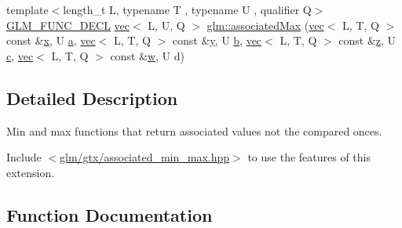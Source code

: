 \begin{DoxyCompactItemize}
\item 
{\footnotesize template$<$length\+\_\+t L, typename T , typename U , qualifier Q$>$ }\\\mbox{\hyperlink{setup_8hpp_ab2d052de21a70539923e9bcbf6e83a51}{G\+L\+M\+\_\+\+F\+U\+N\+C\+\_\+\+D\+E\+CL}} \mbox{\hyperlink{structglm_1_1vec}{vec}}$<$ L, U, Q $>$ \mbox{\hyperlink{group__gtx__associated__min__max_gab9c3dd74cac899d2c625b5767ea3b3fb}{glm\+::associated\+Max}} (\mbox{\hyperlink{structglm_1_1vec}{vec}}$<$ L, T, Q $>$ const \&\mbox{\hyperlink{_s_d_l__opengl_8h_ad0e63d0edcdbd3d79554076bf309fd47}{x}}, U \mbox{\hyperlink{_s_d_l__opengl__glext_8h_a3309789fc188587d666cda5ece79cf82}{a}}, \mbox{\hyperlink{structglm_1_1vec}{vec}}$<$ L, T, Q $>$ const \&\mbox{\hyperlink{_s_d_l__opengl_8h_a1675d9d7bb68e1657ff028643b4037e3}{y}}, U \mbox{\hyperlink{_s_d_l__opengl__glext_8h_a0f71581a41fd2264c8944126dabbd010}{b}}, \mbox{\hyperlink{structglm_1_1vec}{vec}}$<$ L, T, Q $>$ const \&\mbox{\hyperlink{_s_d_l__opengl__glext_8h_a5e74030ebb3297ce1b37ff716fedd68f}{z}}, U \mbox{\hyperlink{_s_d_l__opengl__glext_8h_a1f2d7f8147412c43ba2303a56f97ee73}{c}}, \mbox{\hyperlink{structglm_1_1vec}{vec}}$<$ L, T, Q $>$ const \&\mbox{\hyperlink{_s_d_l__opengl__glext_8h_a6ee8f168a7ab6785a9bb57c6715dad99}{w}}, U d)
\end{DoxyCompactItemize}


\subsection{Detailed Description}
Min and max functions that return associated values not the compared onces. 

Include $<$\mbox{\hyperlink{associated__min__max_8hpp}{glm/gtx/associated\+\_\+min\+\_\+max.\+hpp}}$>$ to use the features of this extension. 

\subsection{Function Documentation}
\mbox{\label{group__gtx__associated__min__max_ga7d9c8785230c8db60f72ec8975f1ba45}} 
